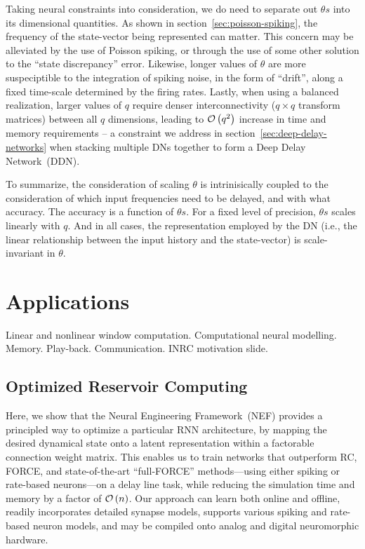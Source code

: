 Taking neural constraints into consideration, we do need to separate out $\theta s$ into its dimensional quantities.
As shown in section~\ref{sec:poisson-spiking}, the frequency of the state-vector being represented can matter.
This concern may be alleviated by the use of Poisson spiking, or through the use of some other solution to the ``state discrepancy'' error.
Likewise, longer values of $\theta$ are more suspeciptible to the integration of spiking noise, in the form of ``drift'', along a fixed time-scale determined by the firing rates.
Lastly, when using a balanced realization, larger values of $q$ require denser interconnectivity ($q \times q$ transform matrices) between all $q$ dimensions, leading to $\mathcal{O}\left({q^2}\right)$ increase in time and memory requirements -- a constraint we address in section~\ref{sec:deep-delay-networks} when stacking multiple DNs together to form a Deep Delay Network~(DDN).

To summarize, the consideration of scaling $\theta$ is intrinisically coupled to the consideration of which input frequencies need to be delayed, and with what accuracy.
The accuracy is a function of $\theta s$.
For a fixed level of precision, $\theta s$ scales linearly with $q$.
And in all cases, the representation employed by the DN (i.e., the linear relationship between the input history and the state-vector) is scale-invariant in $\theta$.

\section{Applications}
\label{sec:delay-applications}

 Linear and nonlinear window computation. Computational neural modelling.
Memory. Play-back. Communication.
INRC motivation slide.

\subsection{Optimized Reservoir Computing}
\label{sec:delay-rc}



Here, we show that the Neural Engineering Framework~(NEF) provides a principled way to optimize a particular RNN architecture, by mapping the desired dynamical state onto a latent representation within a factorable connection weight matrix.
This enables us to train networks that outperform RC, FORCE, and state-of-the-art ``full-FORCE'' methods---using either spiking or rate-based neurons---on a delay line task, while reducing the simulation time and memory by a factor of $\mathcal{O}\left({n}\right)$.
Our approach can learn both online and offline, readily incorporates detailed synapse models, supports various spiking and rate-based neuron models, and may be compiled onto analog and digital neuromorphic hardware.

